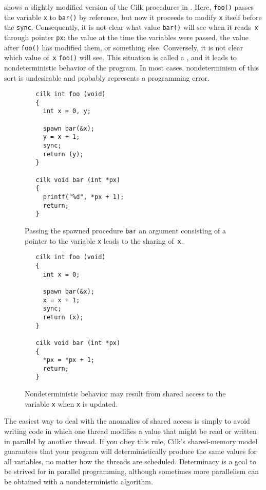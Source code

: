   shows a slightly modified
version of the Cilk procedures in .  Here,
\texttt{foo()} passes the variable \texttt{x} to \texttt{bar()} by
reference, but now it proceeds to modify \texttt{x} itself before the
\texttt{sync}.  Consequently, it is not clear what value
\texttt{bar()} will see when it reads~\texttt{x} through pointer
\texttt{px}: the value at the time the variables were passed, the
value after \texttt{foo()} has modified them, or something else.
Conversely, it is not clear which value of~\texttt{x} \texttt{foo()}
will see.  This situation is called a , and it leads
to nondeterministic behavior of the program.  In most cases,
nondeterminism of this sort is undesirable and probably represents a
programming error.  

\begin{figure*}
\begin{center}
\begin{minipage}[t]{.48\linewidth}
\small
\begin{verbatim}
   cilk int foo (void)
   {
     int x = 0, y;

     spawn bar(&x);
     y = x + 1;
     sync;
     return (y);
   }

   cilk void bar (int *px)
   {
     printf("%d", *px + 1);
     return;
   }
\end{verbatim}
\caption{\small Passing the spawned procedure \texttt{bar} an argument
consisting of a pointer to the variable \texttt{x} leads to the
sharing of~\texttt{x}.}
\label{fig:shared-legal}
\end{minipage}
\hfill
\begin{minipage}[t]{.48\linewidth}
\small
\begin{verbatim}
   cilk int foo (void)
   {
     int x = 0;

     spawn bar(&x);
     x = x + 1;
     sync;
     return (x);
   }

   cilk void bar (int *px)
   {
     *px = *px + 1;
     return;
   }
\end{verbatim}
\caption{\small Nondeterministic behavior may result from shared access to
the variable \texttt{x} when \texttt{x} is updated.}
\label{fig:shared-race}
\end{minipage}
\end{center}
\end{figure*}

The easiest way to deal with the anomalies of shared access is simply
to avoid writing code in which one thread modifies a value that might be
read or written in parallel by another thread.  If you obey this rule,
Cilk's shared-memory model guarantees that your program will
deterministically produce the same values for all variables, no matter
how the threads are scheduled.  Determinacy is a goal to be strived
for in parallel programming, although sometimes more parallelism can
be obtained with a nondeterministic algorithm.

